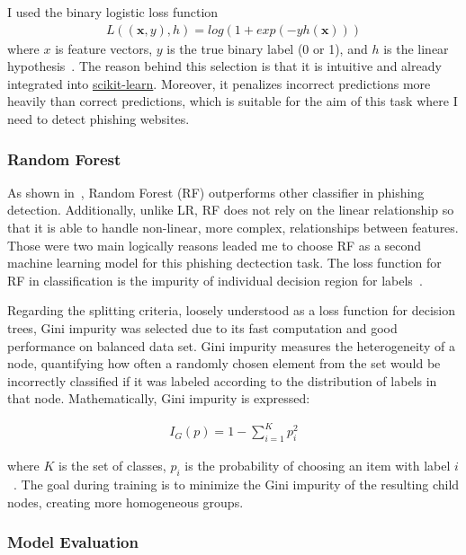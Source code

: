 I used the binary logistic loss function
\begin{align}
    L((\mathbf{x},y),h) = log(1+exp(-yh(\mathbf{x})))
\end{align}
where $x$ is feature vectors, $y$ is the true binary label (0 or 1), and $h$ is the linear hypothesis~\cite{ml-book}.
The reason behind this selection is that it is intuitive and already integrated into
\href{https://scikit-learn.org/stable/}{scikit-learn}.
Moreover, it penalizes incorrect predictions more heavily than correct predictions, which is suitable for
the aim of this task where I need to detect phishing websites.

\subsubsection{Random Forest}
As shown in~\cite{CHIEW2019153,SAHINGOZ2019345}, Random Forest (RF) outperforms other
classifier in phishing detection. Additionally, unlike LR, RF does not rely on the
linear relationship so that it is able to handle non-linear, more complex, relationships
between features. Those were two main logically reasons leaded me to choose RF as
a second machine learning model for this phishing dectection task. The loss function for
RF in classification is the impurity of individual decision region for labels~\cite{ml-book}.

Regarding the splitting criteria, loosely understood as a loss function for decision trees,
Gini impurity was selected due to its fast computation and good performance on balanced
data set. Gini impurity measures the heterogeneity of a node, quantifying how often
a randomly chosen element from the set would be incorrectly classified if it was labeled
according to the distribution of labels in that node. Mathematically, Gini impurity is
expressed:

\begin{align}
    I_G(p) = 1 - \sum_{i=1}^{K}p_i^2
\end{align}

where $K$ is the set of classes, $p_i$ is the probability of choosing an item with label
$i$~\cite{gini-formula}. The goal during training is to minimize the Gini impurity of
the resulting child nodes, creating more homogeneous groups.

\subsubsection{Model Evaluation}

